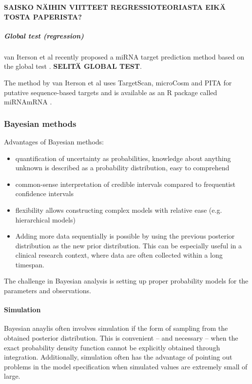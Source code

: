 \textbf{SAISKO NÄIHIN VIITTEET REGRESSIOTEORIASTA EIKÄ TOSTA PAPERISTA?}


\subparagraph{Global test (regression)}\label{global-test-regression}

van Iterson et al recently proposed a miRNA target prediction method based on
the global test \cite{vanIterson2013}. \textbf{SELITÄ GLOBAL TEST}.

The method by van Iterson et al uses TargetScan, microCosm and PITA for
putative sequence-based targets and is available as an R package called
miRNAmRNA \cite{vanItersonWeb}.





\subsubsection{Bayesian methods}\label{bayesian-methods}

Advantages of Bayesian methods:
\begin{itemize}
\tightlist
  \item
  quantification of uncertainty as probabilities, knowledge about anything
  unknown is described as a probability distribution, easy to comprehend
  \item
  common-sense interpretation of credible intervals compared to frequentist
  confidence intervals
  \item
  flexibility allows constructing complex models with relative ease (e.g.
  hierarchical models)
  \item
  Adding more data sequentially is possible by using the previous posterior
  distribution as the new prior distribution. This can be especially useful in
  a clinical research context, where data are often collected within a long
  timespan.
\end{itemize}
The challenge in Bayesian analysis is setting up proper probability models for
the parameters and observations.


\paragraph{Simulation}\label{simulation}

Bayesian anaylis often involves simulation if the form of sampling from the
obtained posterior distribution. This is convenient -- and necessary -- when
the exact probability density function cannot be explicitly obtained through
integration. Additionally, simulation often has the advantage of pointing out
problems in the model specification when simulated values are extremely small
of large.

